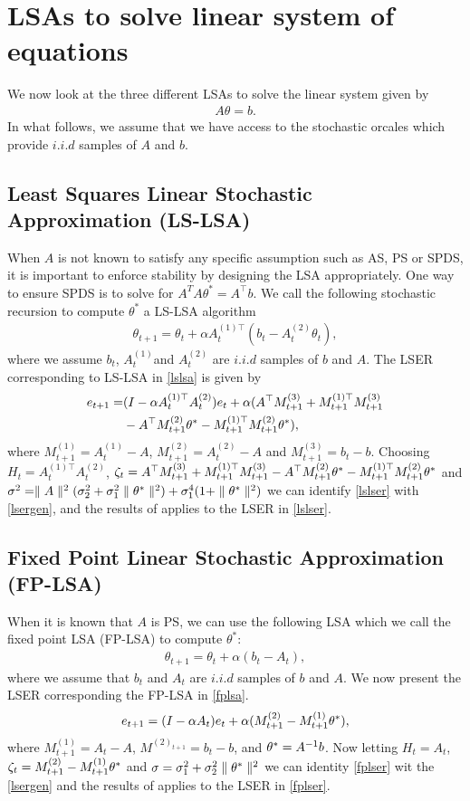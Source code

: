 \section{LSAs to solve linear system of equations}
 We now look at the three different LSAs to solve the linear system given by
\begin{align}\label{linsys}
A\theta=b.
\end{align}
In what follows, we assume that we have access to the stochastic orcales which provide $i.i.d$ samples of $A$ and $b$.
\subsection{Least Squares Linear Stochastic Approximation (LS-LSA)}
When $A$ is not known to satisfy any specific assumption such as AS, PS or SPDS, it is important to enforce stability by designing the LSA appropriately. One way to ensure SPDS is to solve for $A^TA\theta^*=A^\top b$. We call the following stochastic recursion to compute $\theta^*$ a LS-LSA algorithm
\begin{align}\label{lslsa}
\theta_{t+1}=\theta_t+\alpha A^{(1)\top}_t(b_t-A^{(2)}_t\theta_t),
\end{align}
where we assume $b_t$, $A^{(1)}_t$and $A^{(2)}_t$ are $i.i.d$ samples of $b$ and $A$. The LSER corresponding to LS-LSA in \eqref{lslsa} is given by
\begin{align}\label{lslser}
e_{t+1}=&(I-\alpha A^{(1)\top}_tA^{(2)}_t)e_t+\alpha(A^\top M^{(3)}_{t+1}+M^{(1)\top}_{t+1}M^{(3)}_{t+1}\nonumber\\&-A^\top M^{(2)}_{t+1}\theta^*-M^{(1)\top}_{t+1}M^{(2)}_{t+1}\theta^*),
\end{align}
where $M^{(1)}_{t+1}=A^{(1)}_t-A$, $M^{(2)}_{t+1}=A^{(2)}_t-A$ and $M^{(3)}_{t+1}=b_t-b$. Choosing $H_t=A^{(1)\top}_tA^{(2)}_t$, $\zeta_t= A^\top M^{(3)}_{t+1}+M^{(1)\top}_{t+1}M^{(3)}_{t+1}-A^\top M^{(2)}_{t+1}\theta^*-M^{(1)\top}_{t+1}M^{(2)}_{t+1}\theta^*$ and $\sigma^2=\parallel A\parallel^2 (\sigma_2^2+\sigma_1^2\parallel \theta^*\parallel^2)+ \sigma_1^4(1+\parallel \theta^*\parallel^2)$ we can identify \eqref{lslser} with \eqref{lsergen}, and  the results of  applies to the LSER in \eqref{lslser}.
\subsection{Fixed Point Linear Stochastic Approximation (FP-LSA)}
When it is known that $A$ is PS,  we can use the following LSA which we call the fixed point LSA (FP-LSA) to compute $\theta^*$:
\begin{align}\label{fplsa}
\theta_{t+1}=\theta_t+\alpha(b_t-A_t),
\end{align}
where we assume that $b_t$ and $A_t$ are $i.i.d$ samples of $b$ and $A$. We now present the LSER corresponding the FP-LSA in \eqref{fplsa}.
\begin{align}\label{fplser}
e_{t+1}=(I-\alpha A_t)e_t+\alpha(M^{(2)}_{t+1}-M^{(1)}_{t+1}\theta^*),
\end{align}
where $M^{(1)}_{t+1}=A_t-A$, $M^{(2)_{t+1}}=b_t-b$,  and $\theta^*=A^{-1}b$. Now letting $H_t=A_t$, $\zeta_t=M^{(2)}_{t+1}-M^{(1)}_{t+1}\theta^*$ and $\sigma=\sigma_1^2+\sigma^2_2 \parallel\theta^*\parallel^2$ we can identity \eqref{fplser} wit the \eqref{lsergen} and the results of  applies to the LSER in \eqref{fplser}.
